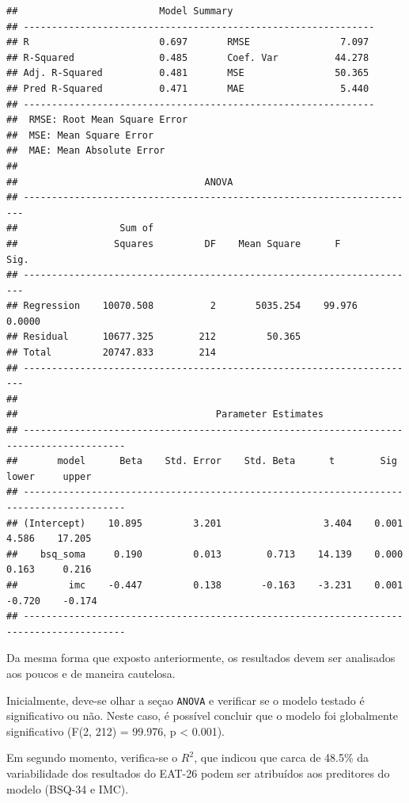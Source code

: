 \documentclass[
]{book}
\begin{document}
\begin{verbatim}
##                         Model Summary                          
## --------------------------------------------------------------
## R                       0.697       RMSE                7.097 
## R-Squared               0.485       Coef. Var          44.278 
## Adj. R-Squared          0.481       MSE                50.365 
## Pred R-Squared          0.471       MAE                 5.440 
## --------------------------------------------------------------
##  RMSE: Root Mean Square Error 
##  MSE: Mean Square Error 
##  MAE: Mean Absolute Error 
## 
##                                 ANOVA                                  
## ----------------------------------------------------------------------
##                  Sum of                                               
##                 Squares         DF    Mean Square      F         Sig. 
## ----------------------------------------------------------------------
## Regression    10070.508          2       5035.254    99.976    0.0000 
## Residual      10677.325        212         50.365                     
## Total         20747.833        214                                    
## ----------------------------------------------------------------------
## 
##                                   Parameter Estimates                                    
## ----------------------------------------------------------------------------------------
##       model      Beta    Std. Error    Std. Beta      t        Sig      lower     upper 
## ----------------------------------------------------------------------------------------
## (Intercept)    10.895         3.201                  3.404    0.001     4.586    17.205 
##    bsq_soma     0.190         0.013        0.713    14.139    0.000     0.163     0.216 
##         imc    -0.447         0.138       -0.163    -3.231    0.001    -0.720    -0.174 
## ----------------------------------------------------------------------------------------
\end{verbatim}

Da mesma forma que exposto anteriormente, os resultados devem ser
analisados aos poucos e de maneira cautelosa.

Inicialmente, deve-se olhar a seçao \texttt{ANOVA} e verificar se o
modelo testado é significativo ou não. Neste caso, é possível concluir
que o modelo foi globalmente significativo (F(2, 212) = 99.976, p
\textless{} 0.001).

Em segundo momento, verifica-se o \(R^2\), que indicou que carca de
48.5\% da variabilidade dos resultados do EAT-26 podem ser atribuídos
aos preditores do modelo (BSQ-34 e IMC).
\end{document}
